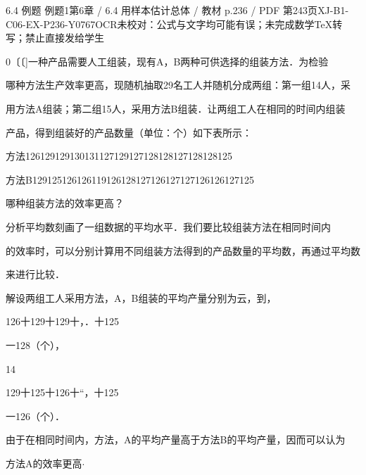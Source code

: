 \begin{bankitem}{6.4 例题 例题1}{第6章 / 6.4 用样本估计总体 / 教材 p.236 / PDF 第243页}{XJ-B1-C06-EX-P236-Y0767}{OCR未校对：公式与文字均可能有误；未完成数学TeX转写；禁止直接发给学生}
\begin{ocrdraft}
\par
0〔〔]一种产品需要人工组装，现有A，B两种可供选择的组装方法．为检验
\par
哪种方法生产效率更高，现随机抽取29名工人并随机分成两组：第一组14人，采
\par
用方法A组装；第二组15人，采用方法B组装．让两组工人在相同的时间内组装
\par
产品，得到组装好的产品数量（单位：个）如下表所示：
\par
方法126129129130131127129127128128127128128125
\par
方法B129125126126119126128127126127127126126127125
\par
哪种组装方法的效率更高？
\par
分析平均数刻画了一组数据的平均水平．我们要比较组装方法在相同时间内
\par
的效率时，可以分别计算用不同组装方法得到的产品数量的平均数，再通过平均数
\par
来进行比较．
\par
解设两组工人采用方法，A，B组装的平均产量分别为云，到，
\par
126十129十129十，．十125
\par
一128（个），
\par
14
\par
129十125十126十“，十125
\par
一126（个）．
\par
由于在相同时间内，方法，A的平均产量高于方法B的平均产量，因而可以认为
\par
方法A的效率更高\ensuremath{\cdot}
\end{ocrdraft}
\end{bankitem}
